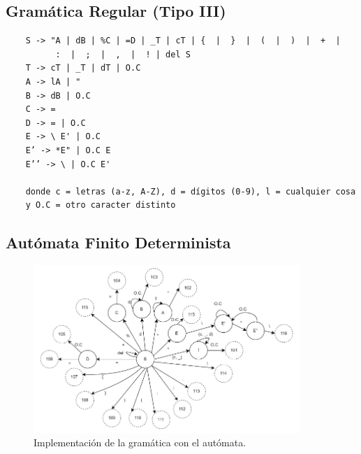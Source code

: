 \documentclass{article}[a4paper]
\begin{document}
\subsection{Gramática Regular (Tipo III)}
\begin{verbatim}
    S -> "A | dB | %C | =D | _T | cT | {  |  }  |  (  |  )  |  +  |
          :  |  ;  |  ,  |  ! | del S
    T -> cT | _T | dT | O.C 
    A -> lA | " 
    B -> dB | O.C
    C -> =
    D -> = | O.C
    E -> \ E' | O.C
    E’ -> *E" | O.C E
    E’’ -> \ | O.C E'
    
    donde c = letras (a-z, A-Z), d = dígitos (0-9), l = cualquier cosa 
    y O.C = otro caracter distinto
\end{verbatim} 

\subsection{Autómata Finito Determinista}
\begin{figure}[h!]
\centering
\includegraphics[width=0.9\textwidth]{automataAnLex.png}
\caption{\label{figura:automata}Implementación de la gramática con el autómata.}
\end{figure}
\end{document}
